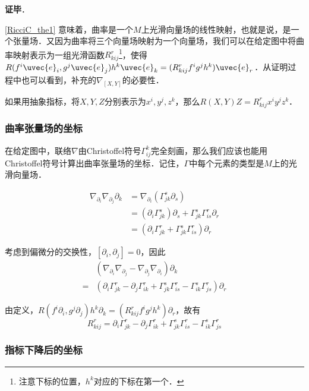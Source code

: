 \textbf{证毕}．

\autoref{RicciC_the1} 意味着，曲率是一个$M$上光滑向量场的线性映射，也就是说，是一个张量场．又因为曲率将三个向量场映射为一个向量场，我们可以在给定图中将曲率映射表示为一组光滑函数$R^r_{kij}$\footnote{注意下标的位置，$h^k$对应的下标在第一个．}，使得$R(f^i\uvec{e}_i, g^j\uvec{e}_j)h^k\uvec{e}_k=(R^r_{kij}f^ig^jh^k)\uvec{e}_r$．从证明过程中也可以看到，补充的$\nabla_{[X, Y]}$的必要性．

如果用抽象指标，将$X, Y, Z$分别表示为$x^i, y^j, z^k$，那么$R(X, Y)Z=R^r_{kij}x^iy^jz^k$．


\subsubsection{曲率张量场的坐标}

在给定图中，联络$\nabla$由Christoffel符号$\Gamma^k_{ij}$完全刻画，那么我们应该也能用Christoffel符号计算出曲率张量场的坐标．记住，$\Gamma$中每个元素的类型是$M$上的光滑向量场．

\begin{equation}
\begin{aligned}
\nabla_{\partial_i}\nabla_{\partial_j}\partial_k&=\nabla_{\partial_i}(\Gamma^s_{jk}\partial_s)\\
&=(\partial_i\Gamma^s_{jk})\partial_s+\Gamma^s_{jk}\Gamma^r_{is}\partial_r\\
&=(\partial_i\Gamma^r_{jk}+\Gamma^s_{jk}\Gamma^r_{is})\partial_r
\end{aligned}
\end{equation}


考虑到偏微分的交换性，$[\partial_i, \partial_j]=0$，因此
\begin{equation}
\begin{aligned}
&(\nabla_{\partial_i}\nabla_{\partial_j}-\nabla_{\partial_j}\nabla_{\partial_i})\partial_k\\
=&(\partial_i\Gamma^r_{jk}-\partial_j\Gamma^{r}_{ik}+\Gamma^s_{jk}\Gamma^r_{is}-\Gamma^s_{ik}\Gamma^r_{js})\partial_r
\end{aligned}
\end{equation}

由定义，$R(f^i\partial_i, g^j\partial_j)h^k\partial_k=(R^r_{kij}f^ig^jh^k)\partial_r$，故有
\begin{equation}\label{RicciC_eq1}
R^r_{kij}=\partial_i\Gamma^r_{jk}-\partial_j\Gamma^{r}_{ik}+\Gamma^s_{jk}\Gamma^r_{is}-\Gamma^s_{ik}\Gamma^r_{js}
\end{equation}

\subsubsection{指标下降后的坐标}

